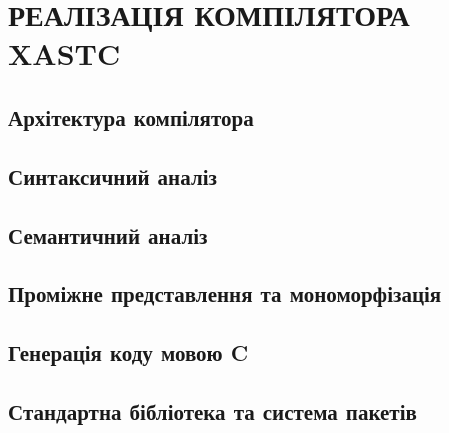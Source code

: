 \chapter{РЕАЛІЗАЦІЯ КОМПІЛЯТОРА XASTC}

\section{Архітектура компілятора}

\section{Синтаксичний аналіз}

\section{Семантичний аналіз}

\section{Проміжне представлення та мономорфізація}

\section{Генерація коду мовою C}

\section{Стандартна бібліотека та система пакетів}
